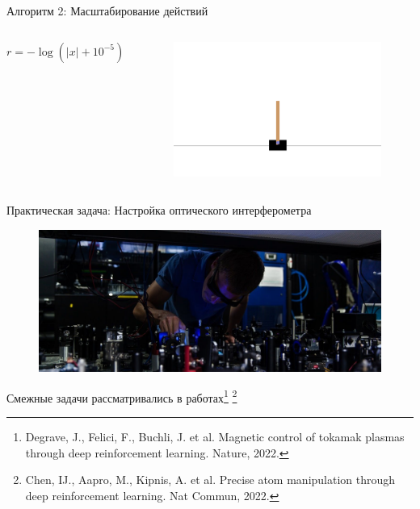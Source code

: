 \begin{frame}{Алгоритм 2: Масштабирование действий\footnotemark}
\begin{minipage}{\linewidth}
\begin{columns}
\vspace{10pt}\hspace{-5pt} $r = -\log(|x| + 10^{-5})$  


\begin{figure}
    \centering
    \includegraphics[width=0.8\linewidth]{Presentation/images/cartpole.png}
\end{figure}
\end{columns}
\end{minipage}


\end{frame}



\begin{frame}{Практическая задача: Настройка оптического интерферометра}
\vspace{-30pt}
\begin{figure}
  \centering
  \includegraphics[width=1\linewidth]{Presentation/images/labinterf.jpg}
\end{figure}
\vspace{-10pt}

\setcounter{footnote}{0} 
Смежные задачи рассматривались в работах\footnote{Degrave, J., Felici, F., Buchli, J. et al. Magnetic control of tokamak plasmas through deep reinforcement learning. Nature, 2022.}
\footnote{Chen, IJ., Aapro, M., Kipnis, A. et al. Precise atom manipulation through deep reinforcement learning. Nat Commun, 2022.}
\end{frame}


